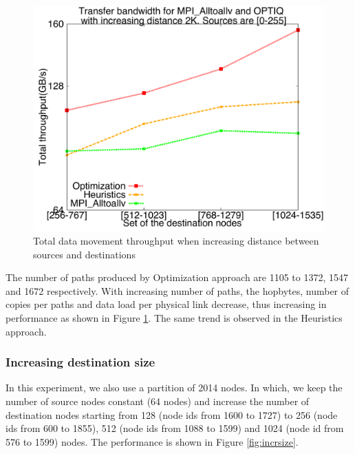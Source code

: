\begin{figure}[!htb]
\vspace{-0.1in}
\centering
\includegraphics[scale=0.30]{figures/incrdist.pdf}
\vspace{-0.1in}
\caption{Total data movement throughput when increasing distance between sources and destinations}
\vspace{-0.1in}
\label{fig:incrdist}
\end{figure}

The number of paths produced by Optimization approach are 1105 to 1372, 1547 and 1672 respectively. With increasing number of paths, the hopbytes, number of copies per paths and data load per physical link decrease, thus increasing in performance as shown in Figure \ref{fig:incrdist}. The same trend is observed in the Heuristics approach.

\subsubsection{Increasing destination size}

In this experiment, we also use a partition of 2014 nodes. In which, we keep the number of source nodes constant (64 nodes) and increase the number of destination nodes starting from 128 (node ids from 1600 to 1727) to 256 (node ids from 600 to 1855), 512 (node ids from 1088 to 1599) and 1024 (node id from 576 to 1599) nodes. The performance is shown in Figure \ref{fig:incrsize}.

